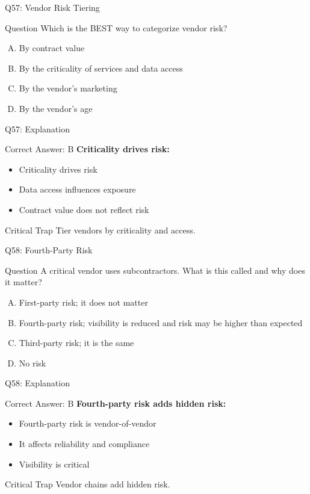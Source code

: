 \documentclass{beamer}
\begin{document}
	\begin{frame}{Q57: Vendor Risk Tiering}
		\begin{block}{Question}
			Which is the BEST way to categorize vendor risk?
		\end{block}
		\begin{enumerate}[(A)]
			\item By contract value
			\item By the criticality of services and data access
			\item By the vendor's marketing
			\item By the vendor's age
		\end{enumerate}
	\end{frame}
	
	\begin{frame}{Q57: Explanation}
		\begin{block}{Correct Answer: B}
			\textbf{Criticality drives risk:}
			\begin{itemize}
				\item Criticality drives risk
				\item Data access influences exposure
				\item Contract value does not reflect risk
			\end{itemize}
		\end{block}
		\begin{alertblock}{Critical Trap}
			Tier vendors by criticality and access.
		\end{alertblock}
	\end{frame}
	
	\begin{frame}{Q58: Fourth-Party Risk}
		\begin{block}{Question}
			A critical vendor uses subcontractors. What is this called and why does it matter?
		\end{block}
		\begin{enumerate}[(A)]
			\item First-party risk; it does not matter
			\item Fourth-party risk; visibility is reduced and risk may be higher than expected
			\item Third-party risk; it is the same
			\item No risk
		\end{enumerate}
	\end{frame}
	
	\begin{frame}{Q58: Explanation}
		\begin{block}{Correct Answer: B}
			\textbf{Fourth-party risk adds hidden risk:}
			\begin{itemize}
				\item Fourth-party risk is vendor-of-vendor
				\item It affects reliability and compliance
				\item Visibility is critical
			\end{itemize}
		\end{block}
		\begin{alertblock}{Critical Trap}
			Vendor chains add hidden risk.
		\end{alertblock}
	\end{frame}
	
\end{document}
